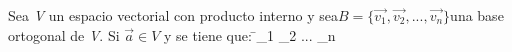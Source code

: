 \documentclass[preview]{standalone}
\begin{document}
\begin{center}
Sea \textit{V} un espacio vectorial con producto interno y sea$B = \{\vec{v_1}, \vec{v_2}, ..., \vec{v_n}\}$una base ortogonal de \textit{V}. Si $\vec{a} \in V$ y se tiene que: \= \alpha_1  \+ \alpha_2  \+ ... \+ \alpha_n 
\end{center}
\end{document}
